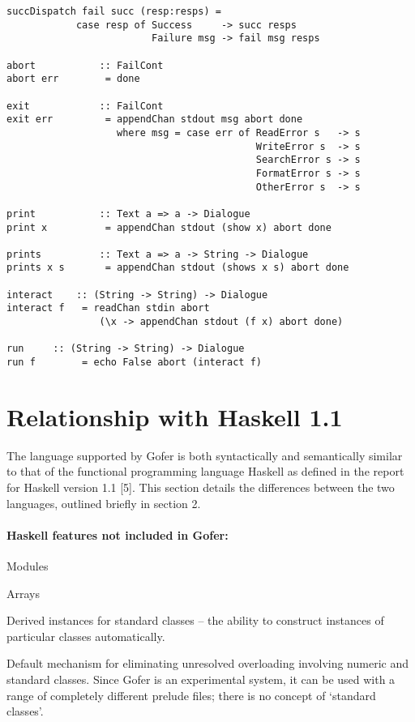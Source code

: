 \begin{verbatim}
succDispatch fail succ (resp:resps) = 
            case resp of Success     -> succ resps
                         Failure msg -> fail msg resps

abort           :: FailCont
abort err        = done

exit            :: FailCont
exit err         = appendChan stdout msg abort done
                   where msg = case err of ReadError s   -> s
                                           WriteError s  -> s
                                           SearchError s -> s
                                           FormatError s -> s
                                           OtherError s  -> s

print           :: Text a => a -> Dialogue
print x          = appendChan stdout (show x) abort done

prints          :: Text a => a -> String -> Dialogue
prints x s       = appendChan stdout (shows x s) abort done

interact	:: (String -> String) -> Dialogue
interact f	 = readChan stdin abort
			    (\x -> appendChan stdout (f x) abort done)

run		:: (String -> String) -> Dialogue
run f		 = echo False abort (interact f)

\end{verbatim}

\chapter{Relationship with Haskell 1.1}

The language supported by Gofer is both syntactically and  semantically
similar to that of  the  functional  programming  language  Haskell  as
defined in the report  for  Haskell  version  1.1  [5].   This  section
details the differences between the two languages, outlined briefly  in
section 2.

\subsubsection*{Haskell features not included in Gofer:}
\BI
\IT  Modules

\IT  Arrays

\IT  Derived instances for standard classes -- the ability to construct
     instances of particular classes automatically.

\IT  Default mechanism for eliminating unresolved overloading involving
     numeric and standard classes.   Since  Gofer  is  an  experimental
     system, it can be  used  with  a  range  of  completely  different
     prelude files; there is no concept of `standard classes'.

